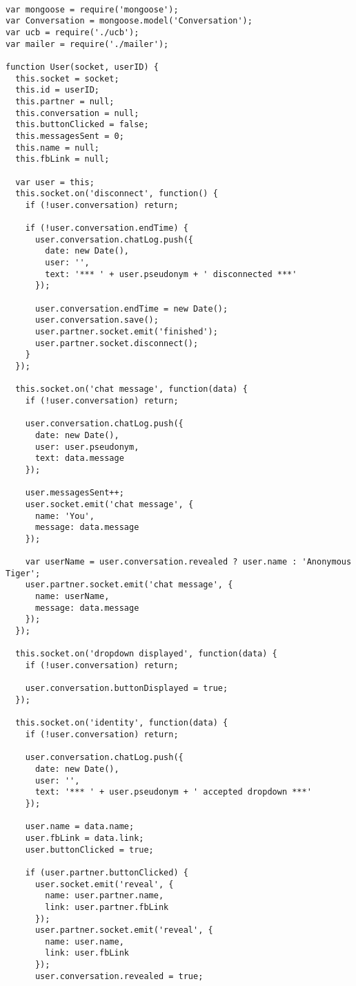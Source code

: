 \begin{lstlisting}

var mongoose = require('mongoose');
var Conversation = mongoose.model('Conversation');
var ucb = require('./ucb');
var mailer = require('./mailer');

function User(socket, userID) {
  this.socket = socket;
  this.id = userID;
  this.partner = null;
  this.conversation = null;
  this.buttonClicked = false;
  this.messagesSent = 0;
  this.name = null;
  this.fbLink = null;

  var user = this;
  this.socket.on('disconnect', function() {
    if (!user.conversation) return;

    if (!user.conversation.endTime) {
      user.conversation.chatLog.push({
        date: new Date(),
        user: '',
        text: '*** ' + user.pseudonym + ' disconnected ***'
      });

      user.conversation.endTime = new Date();
      user.conversation.save();
      user.partner.socket.emit('finished');
      user.partner.socket.disconnect();
    }
  });

  this.socket.on('chat message', function(data) {
    if (!user.conversation) return;

    user.conversation.chatLog.push({
      date: new Date(),
      user: user.pseudonym,
      text: data.message
    });

    user.messagesSent++;
    user.socket.emit('chat message', {
      name: 'You',
      message: data.message
    });

    var userName = user.conversation.revealed ? user.name : 'Anonymous Tiger';
    user.partner.socket.emit('chat message', {
      name: userName,
      message: data.message
    });
  });

  this.socket.on('dropdown displayed', function(data) {
    if (!user.conversation) return;

    user.conversation.buttonDisplayed = true;
  });

  this.socket.on('identity', function(data) {
    if (!user.conversation) return;

    user.conversation.chatLog.push({
      date: new Date(),
      user: '',
      text: '*** ' + user.pseudonym + ' accepted dropdown ***'
    });

    user.name = data.name;
    user.fbLink = data.link;
    user.buttonClicked = true;

    if (user.partner.buttonClicked) {
      user.socket.emit('reveal', {
        name: user.partner.name,
        link: user.partner.fbLink
      });
      user.partner.socket.emit('reveal', {
        name: user.name,
        link: user.fbLink
      });
      user.conversation.revealed = true;


\end{lstlisting}
